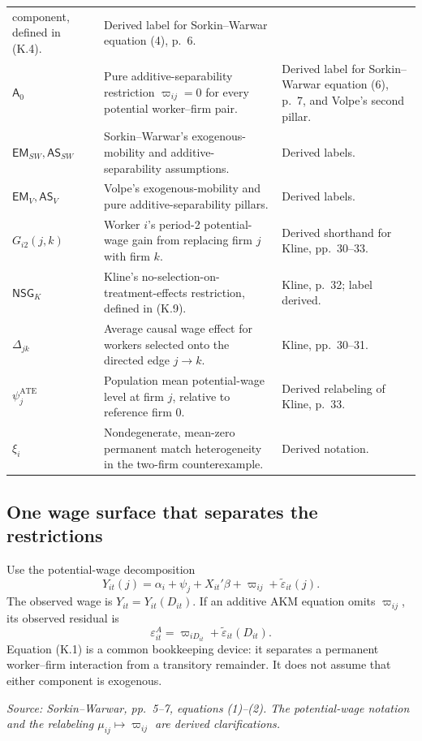 \documentclass[11pt]{article}
\begin{document}
\begin{longtable}{p{}p{}p{}}
component, defined in (K.4). & Derived label for Sorkin--Warwar equation
(4), p.\ 6. \\
\(\mathsf A_0\) & Pure additive-separability restriction
\(\varpi_{ij}=0\) for every potential worker--firm pair. & Derived label for
Sorkin--Warwar equation (6), p.\ 7, and Volpe's second pillar. \\
\(\mathsf{EM}_{SW},\mathsf{AS}_{SW}\) & Sorkin--Warwar's exogenous-mobility
and additive-separability assumptions. & Derived labels. \\
\(\mathsf{EM}_{V},\mathsf{AS}_{V}\) & Volpe's exogenous-mobility and pure
additive-separability pillars. & Derived labels. \\
\(G_{i2}(j,k)\) & Worker \(i\)'s period-2 potential-wage gain from replacing
firm \(j\) with firm \(k\). & Derived shorthand for Kline, pp.\ 30--33. \\
\(\mathsf{NSG}_{K}\) & Kline's no-selection-on-treatment-effects
restriction, defined in (K.9). & Kline, p.\ 32; label derived. \\
\(\Delta_{jk}\) & Average causal wage effect for workers selected onto the
directed edge \(j\to k\). & Kline, pp.\ 30--31. \\
\(\psi_j^{\mathrm{ATE}}\) & Population mean potential-wage level at firm
\(j\), relative to reference firm \(0\). & Derived relabeling of Kline,
p.\ 33. \\
\(\xi_i\) & Nondegenerate, mean-zero permanent match heterogeneity in the
two-firm counterexample. & Derived notation. \\
\end{longtable}

\subsection{One wage surface that separates the restrictions}

Use the potential-wage decomposition
\[
Y_{it}(j)
=
\alpha_i+\psi_j+X_{it}'\beta
+\varpi_{ij}
+\widetilde\varepsilon_{it}(j).
\tag{K.1}
\]
The observed wage is \(Y_{it}=Y_{it}(D_{it})\).  If an additive AKM equation
omits \(\varpi_{ij}\), its observed residual is
\[
\varepsilon^A_{it}
=
\varpi_{iD_{it}}
+\widetilde\varepsilon_{it}(D_{it}).
\tag{K.2}
\]
Equation (K.1) is a common bookkeeping device: it separates a permanent
worker--firm interaction from a transitory remainder.  It does not assume
that either component is exogenous.

\textit{Source: Sorkin--Warwar, pp.\ 5--7, equations (1)--(2).
The potential-wage notation and the relabeling
\(\mu_{ij}\mapsto\varpi_{ij}\) are derived clarifications.}
\end{document}
